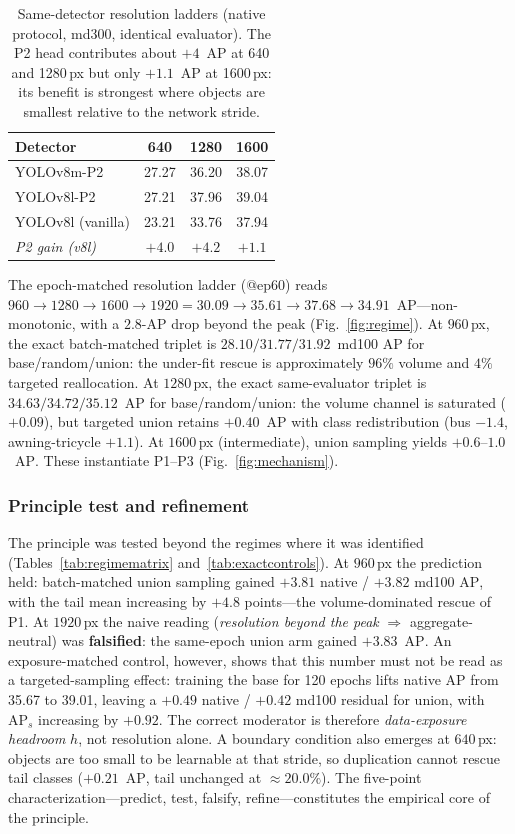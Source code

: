 \documentclass[journal]{IEEEtran}
\newcommand{\ap}{\ensuremath{\mathrm{AP}}}
\newcommand{\aps}{\ensuremath{\mathrm{AP}_{s}}}
\begin{document}
\begin{table}[!t]
\centering
\caption{Same-detector resolution ladders (native protocol, md300, identical evaluator). The P2 head contributes about $+4$~\ap{} at 640 and 1280\,px but only $+1.1$~\ap{} at 1600\,px: its benefit is strongest where objects are smallest relative to the network stride.}
\label{tab:ladder}
\begin{tabular}{lccc}
\toprule
Detector & 640 & 1280 & 1600 \\
\midrule
YOLOv8m-P2 & 27.27 & 36.20 & 38.07 \\
YOLOv8l-P2 & 27.21 & 37.96 & 39.04 \\
YOLOv8l (vanilla) & 23.21 & 33.76 & 37.94 \\
\midrule
\emph{P2 gain (v8l)} & \emph{$+4.0$} & \emph{$+4.2$} & \emph{$+1.1$} \\
\bottomrule
\end{tabular}
\end{table}

The epoch-matched resolution ladder (@ep60) reads $960{\to}1280{\to}1600{\to}1920 = 30.09{\to}35.61{\to}37.68{\to}34.91$~\ap{}---non-monotonic, with a $2.8$-\ap{} drop beyond the peak (Fig.~\ref{fig:regime}). At $960$\,px, the exact batch-matched triplet is $28.10/31.77/31.92$~md100 \ap{} for base/random/union: the under-fit rescue is approximately $96\%$ volume and $4\%$ targeted reallocation. At $1280$\,px, the exact same-evaluator triplet is $34.63/34.72/35.12$~\ap{} for base/random/union: the volume channel is saturated ($+0.09$), but targeted union retains $+0.40$~\ap{} with class redistribution (bus $-1.4$, awning-tricycle $+1.1$). At $1600$\,px (intermediate), union sampling yields $+0.6$--$1.0$~\ap. These instantiate P1--P3 (Fig.~\ref{fig:mechanism}).

\subsubsection{Principle test and refinement}
\label{sec:principletest}
The principle was tested beyond the regimes where it was identified (Tables~\ref{tab:regimematrix} and~\ref{tab:exactcontrols}). At $960$\,px the prediction held: batch-matched union sampling gained $+3.81$ native / $+3.82$ md100 \ap, with the tail mean increasing by $+4.8$ points---the volume-dominated rescue of P1. At $1920$\,px the naive reading (\emph{resolution beyond the peak} $\Rightarrow$ aggregate-neutral) was \textbf{falsified}: the same-epoch union arm gained $+3.83$~\ap. An exposure-matched control, however, shows that this number must not be read as a targeted-sampling effect: training the base for 120 epochs lifts native \ap{} from 35.67 to 39.01, leaving a $+0.49$ native / $+0.42$ md100 residual for union, with \aps{} increasing by $+0.92$. The correct moderator is therefore \emph{data-exposure headroom} $h$, not resolution alone. A boundary condition also emerges at $640$\,px: objects are too small to be learnable at that stride, so duplication cannot rescue tail classes ($+0.21$~\ap, tail unchanged at $\approx 20.0\%$). The five-point characterization---predict, test, falsify, refine---constitutes the empirical core of the principle.
\end{document}
